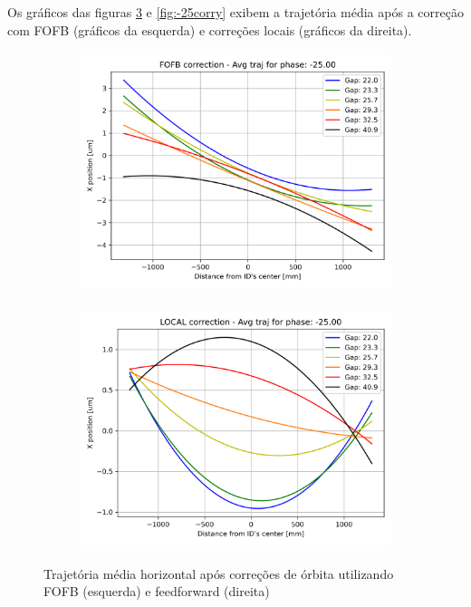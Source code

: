 \documentclass[a4paper,12pt]{article}
\begin{document}
Os gráficos das figuras \ref{fig:-25corrx} e \ref{fig:-25corry} exibem a trajetória média após a correção com FOFB (gráficos da esquerda) e correções locais (gráficos da direita).

\begin{figure}[H]
\begin{subfigure}{0.5\textwidth}
\includegraphics[width=0.9\linewidth, height=7cm]{figs/phase-25 horizontal-avg-traj-FOFB.png} 
\label{fig:subim10xc-25}
\end{subfigure}
\begin{subfigure}{0.5\textwidth}
\includegraphics[width=0.9\linewidth, height=7cm]{figs/phase-25 horizontal-avg-traj-LOCAL.png}
\label{fig:subim20xc-25}
\end{subfigure}
\caption{Trajetória média horizontal após correções de órbita utilizando FOFB (esquerda) e feedforward (direita)}
\label{fig:-25corrx}
\end{figure}
\end{document}
